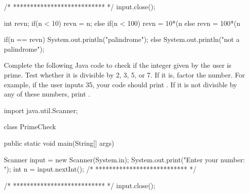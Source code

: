 \documentclass[answers,addpoints]{exam} %
\begin{document}
\begin{questions}
\begin{code}
{{     
     
     
     
     
     
     	/* *************************** */
     	input.close(); 
    }
}
\end{code}

\begin{solution}
\begin{code}
int revn;
if(n < 10) {
    revn = n;
}
else if(n < 100) {
    revn = 10*(n %
}
else {
    revn = 100*(n %
}

if(n == revn) {
    System.out.println("palindrome");
}
else {
    System.out.println("not a palindrome");
}
\end{code}
\end{solution}

\question[15] Complete the following Java code to check if the integer  given by the user is prime. Test whether it is divisible by 2, 3, 5, or 7. If it is, factor the number. For example, if the user inputs 35, your code should print . If it is not divisible by any of these numbers, print .

\begin{code}
import java.util.Scanner;

class PrimeCheck {
    public static void main(String[] args) {
    	Scanner input = new Scanner(System.in);
        System.out.print("Enter your number: ");
        int n = input.nextInt();
       	/* *************************** */
        
        
        
        
        
        
        
     
     
     
     
     
     
     	/* *************************** */
     	input.close(); 
    }
}
\end{code}

\begin{solution}
\end{solution}

\end{questions}
\end{document}
